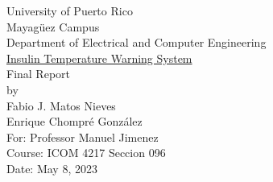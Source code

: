 \begin{titlepage}
  \begin{center}
    \large{University of Puerto Rico\\
    Mayagüez Campus\\
    \vspace{\baselineskip}
    Department of Electrical and Computer Engineering\\}
    \vspace{6cm}
    \Huge{\underline{Insulin Temperature Warning System}\\}
    \vspace{0.3\baselineskip}
    \large{Final Report\\}
    \vspace{0.5\baselineskip}
    \large by\\
    Fabio J. Matos Nieves\\
    Enrique Chompré González\\
    \vspace{4.5cm}
    For: Professor Manuel Jimenez\\
    Course: ICOM 4217 Seccion 096\\
    Date: May 8, 2023\\
    \normalsize

  \end{center}
\end{titlepage}
